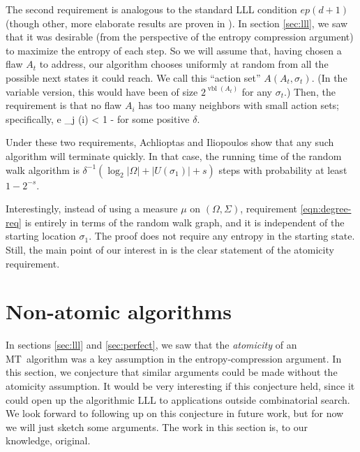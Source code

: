 \documentclass[twocolumn]{article}
\newcommand{\mt}{MT~}
\def\seqn#1\eeqn{\begin{align}#1\end{align}}
\begin{document}
The second requirement is analogous to the standard LLL condition $e p (d+1)$ (though other, more elaborate results are proven in \cite{achlioptas2014random}).  In section \ref{sec:lll}, we saw that it was desirable (from the perspective of the entropy compression argument) to maximize the entropy of each step.  So we will assume that, having chosen a flaw $A_t$ to address, our algorithm chooses uniformly at random from all the possible next states it could reach.  We call this ``action set'' $A(A_t, \sigma_t)$.  (In the variable version, this would have been of size $2^{\operatorname{vbl}(A_t)}$ for any $\sigma_t$.)  Then, the requirement is that no flaw $A_i$ has too many neighbors with small action sets; specifically,
\seqn
  \label{eqn:degree-req}
  e \sum_{j \in \Gamma(i)}  < 1 - \delta
\eeqn
for some positive $\delta$.

Under these two requirements, Achlioptas and Iliopoulos show that any such algorithm will terminate quickly.  In that case, the running time of the random walk algorithm is $\delta^{-1} (\log_2 |\Omega| + |U(\sigma_1)| + s)$ steps with probability at least $1 - 2^{-s}$.

Interestingly, instead of using a measure $\mu$ on $(\Omega, \Sigma)$, requirement \ref{eqn:degree-req} is entirely in terms of the random walk graph, and it is independent of the starting location $\sigma_1$.  The proof does not require any entropy in the starting state.  Still, the main point of our interest in \cite{achlioptas2014random} is the clear statement of the atomicity requirement.

\section{Non-atomic algorithms}
\label{sec:nonatomic}
In sections \ref{sec:lll} and \ref{sec:perfect}, we saw that the \emph{atomicity} of an \mt algorithm was a key assumption in the entropy-compression argument.  In this section, we conjecture that similar arguments could be made without the atomicity assumption.  It would be very interesting if this conjecture held, since it could open up the algorithmic LLL to applications outside combinatorial search.  We look forward to following up on this conjecture in future work, but for now we will just sketch some arguments.  The work in this section is, to our knowledge, original.
\end{document}

